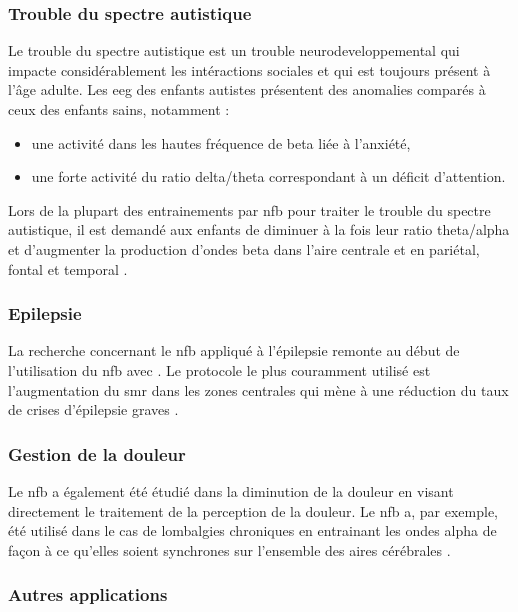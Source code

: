 \subsubsection{Trouble du spectre autistique}

Le trouble du spectre autistique est un trouble neurodeveloppemental qui impacte considérablement les intéractions sociales et qui est toujours présent à 
l'âge adulte. Les \gls{eeg} des enfants autistes présentent des anomalies comparés à ceux des enfants sains, notamment \citep{Coben2010, Kouijzer2010} :
\begin{itemize}
\item une activité dans les hautes fréquence de beta liée à l'anxiété,
\item une forte activité du ratio delta/theta correspondant à un déficit d'attention.
\end{itemize}
Lors de la plupart des entrainements par \gls{nfb} pour traiter le trouble du spectre autistique, il est demandé aux enfants de diminuer à la fois leur ratio 
theta/alpha et d'augmenter la production d'ondes beta dans l'aire centrale \citep{Thompson2010} et en pariétal, fontal et temporal \citep{Othmer2007}. 

\subsubsection{Epilepsie}

La recherche concernant le \gls{nfb} appliqué à l'épilepsie remonte au début de l'utilisation du \gls{nfb} avec \citet{Sterman1974}. Le protocole le plus
couramment utilisé est l'augmentation du \gls{smr} dans les zones centrales qui mène à une réduction du taux de crises d'épilepsie graves \citep{Hughes2008, Walker2010}.

\subsubsection{Gestion de la douleur}

Le \gls{nfb} a également été étudié dans la diminution de la douleur en visant directement le traitement de la perception de la douleur. Le \gls{nfb} a, par
exemple, été utilisé dans le cas de lombalgies chroniques en entrainant les ondes alpha de façon à ce qu'elles soient synchrones sur l'ensemble des aires 
cérébrales \citep{Mayaud2019}.

\subsubsection{Autres applications}

